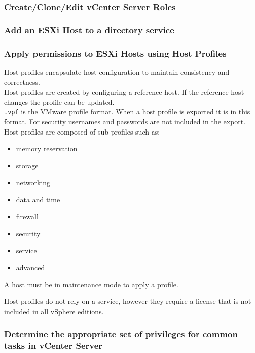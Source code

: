 \subsubsection{Create/Clone/Edit vCenter Server Roles}

\subsubsection{Add an ESXi Host to a directory service}

\subsubsection{Apply permissions to ESXi Hosts using Host Profiles}

Host profiles encapsulate host configuration to maintain consistency and
correctness.\\

Host profiles are created by configuring a reference host. If the reference
host changes the profile can be updated.\\

\texttt{.vpf} is the VMware profile format. When a host profile is exported
it is in this format. For security usernames and passwords are not included
in the export.\\

Host profiles are composed of sub-profiles such as:

\begin{itemize}
\item memory reservation
\item storage
\item networking
\item data and time
\item firewall
\item security
\item service
\item advanced
\end{itemize}

A host must be in maintenance mode to apply a profile.

Host profiles do not rely on a service, however they require a license that
is not included in all vSphere editions.

\subsubsection{Determine the appropriate set of privileges for common tasks in vCenter Server}
